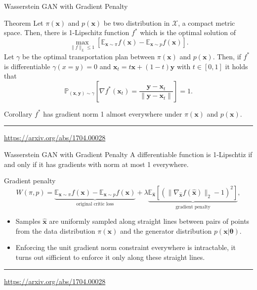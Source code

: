 \documentclass{beamer}
\newcommand{\bx}{\mathbf{x}}
\newcommand{\by}{\mathbf{y}}
\newcommand{\bbE}{\mathbb{E}}
\newcommand{\bbP}{\mathbb{P}}
\newcommand{\cX}{\mathcal{X}}
\newcommand{\btheta}{\boldsymbol{\theta}}
\begin{document}
\begin{frame}{Wasserstein GAN with Gradient Penalty}
	\begin{block}{Theorem}
		Let $\pi(\bx)$ and $p(\bx)$ be two distribution in $\cX$, a compact metric space. Then, there is 1-Lipschitz function $f^*$ which is the optimal solution of 
		\[
			\max_{\| f \|_L \leq 1} \left[ \bbE_{\bx \sim \pi} f(\bx)  - \bbE_{\bx \sim p} f(\bx)\right].
		\]
		Let $\gamma$ be the optimal transportation plan between $\pi(\bx)$ and $p(\bx)$. Then, if $f^*$ is differentiable $\gamma(x = y) = 0$ and $\bx_t = t \bx + (1 - t) \by$ with $t \in [0, 1]$ it holds that
		\[
			\bbP_{(\bx, \by) \sim \gamma} \left[ \nabla f^*(\bx_t) = \frac{\by - \bx_t}{\| \by - \bx_t \|} \right] = 1.
		\]
	\end{block}
	\begin{block}{Corollary}
		$f^*$ has gradient norm 1 almost everywhere under $\pi(\bx)$ and $p(\bx)$.
	\end{block}
	\vfill
	\hrule\medskip 
	{\scriptsize \href{https://arxiv.org/abs/1704.00028}{https://arxiv.org/abs/1704.00028}}
\end{frame}
\begin{frame}{Wasserstein GAN with Gradient Penalty}
	A differentiable function is 1-Lipschtiz if and only if it has gradients with norm at most 1 everywhere.
	\begin{block}{Gradient penalty}
		\[
			W(\pi, p) = \underbrace{\bbE_{\bx \sim \pi} f(\bx)  - \bbE_{\bx \sim p} f(\bx)}_{\text{original critic loss}} + \lambda \underbrace{\bbE_{\hat{\bx}} \left[ \left( \| \nabla_{\hat{\bx}} f(\hat{\bx}) \|_2 - 1 \right) ^ 2\right]}_{\text{gradient penalty}},
		\]
	\end{block}
	\begin{itemize}
		\item Samples $\hat{\bx}$ are uniformly sampled along straight lines between pairs of points from the data distribution $\pi(\bx)$ and the generator distribution $p(\bx | \btheta)$.
		\item Enforcing the unit gradient norm constraint everywhere is intractable, it turns out sifficient to enforce it only along these straight lines.
	\end{itemize}
	\vfill
	\hrule\medskip 
	{\scriptsize \href{https://arxiv.org/abs/1704.00028}{https://arxiv.org/abs/1704.00028}}
\end{frame}
\end{document}
